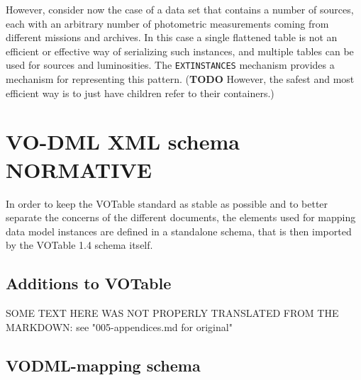 \documentclass[11pt,a4paper]{ivoa}
\begin{document}
However, consider now the case of a data set that contains a number of
sources, each with an arbitrary number of photometric measurements
coming from different missions and archives. In this case a single
flattened table is not an efficient or effective way of serializing such
instances, and multiple tables can be used for sources and luminosities.
The \texttt{EXTINSTANCES} mechanism provides a mechanism for
representing this pattern. (\textbf{TODO} However, the safest and most
efficient way is to just have children refer to their containers.)


\pagebreak

\pagebreak

\appendix

\section{VO-DML XML schema NORMATIVE}\label{sec:schema}

In order to keep the VOTable standard as stable as possible and to
better separate the concerns of the different documents, the elements
used for mapping data model instances are defined in a standalone
schema, that is then imported by the VOTable 1.4 schema itself.

\subsection{Additions to VOTable}\label{additions-to-votable}

SOME TEXT HERE WAS NOT PROPERLY TRANSLATED FROM THE MARKDOWN: see "005-appendices.md for original"

\subsection{VODML-mapping schema}\label{vodml-mapping-schema}
\end{document}
